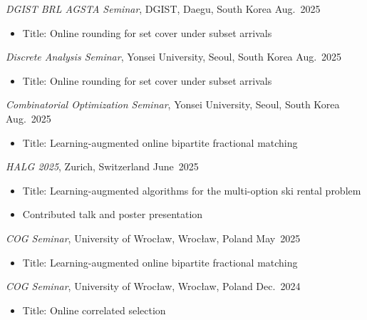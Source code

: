 \documentclass{article}
\newcommand{\killinitspace}{-0.7em}
\begin{document}
\textsl{DGIST BRL AGSTA Seminar}, DGIST, Daegu, South Korea \hfill Aug.~2025
\vspace{\killinitspace}
\begin{itemize}
\item Title: Online rounding for set cover under subset arrivals
\end{itemize}

\textsl{Discrete Analysis Seminar}, Yonsei University, Seoul, South Korea \hfill Aug.~2025
\vspace{\killinitspace}
\begin{itemize}
\item Title: Online rounding for set cover under subset arrivals
\end{itemize}

\textsl{Combinatorial Optimization Seminar}, Yonsei University, Seoul, South Korea  \hfill Aug.~2025
\vspace{\killinitspace}
\begin{itemize}
\item Title: Learning-augmented online bipartite fractional matching
\end{itemize}

\textsl{HALG 2025}, Zurich, Switzerland \hfill June~2025
\vspace{\killinitspace}
\begin{itemize}
\item Title: Learning-augmented algorithms for the multi-option ski rental problem
\item Contributed talk and poster presentation
\end{itemize}

\textsl{COG Seminar}, University of Wrocław, Wrocław, Poland  \hfill May~2025
\vspace{\killinitspace}
\begin{itemize}
\item Title: Learning-augmented online bipartite fractional matching
\end{itemize}

\textsl{COG Seminar}, University of Wrocław, Wrocław, Poland  \hfill Dec.~2024
\vspace{\killinitspace}
\begin{itemize}
\item Title: Online correlated selection
\end{itemize}
\end{document}
